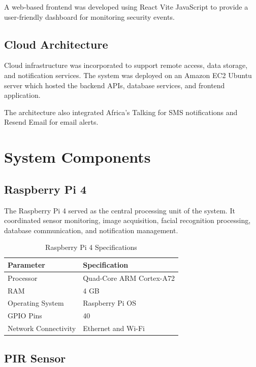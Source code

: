 \documentclass[12pt,a4paper,oneside]{report}
\begin{document}
A web-based frontend was developed using React Vite JavaScript to provide a user-friendly dashboard for monitoring security events.

\subsection{Cloud Architecture}

Cloud infrastructure was incorporated to support remote access, data storage, and notification services. The system was deployed on an Amazon EC2 Ubuntu server which hosted the backend APIs, database services, and frontend application.

The architecture also integrated Africa's Talking for SMS notifications and Resend Email for email alerts.

\section{System Components}

\subsection{Raspberry Pi 4}

The Raspberry Pi 4 served as the central processing unit of the system. It coordinated sensor monitoring, image acquisition, facial recognition processing, database communication, and notification management.

\begin{table}[htbp]
  \centering
  \caption{Raspberry Pi 4 Specifications}
  {\small
  \begin{tabular}{|p{5.00cm}|p{8.00cm}|}
    \hline
    \textbf{Parameter} & \textbf{Specification} \\
    \hline
    Processor           & Quad-Core ARM Cortex-A72 \\
    RAM                 & 4 GB \\
    Operating System    & Raspberry Pi OS \\
    GPIO Pins           & 40 \\
    Network Connectivity & Ethernet and Wi-Fi \\
    \hline
  \end{tabular}
  }
\end{table}

\subsection{PIR Sensor}
\end{document}
